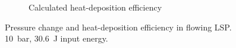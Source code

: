 \begin{figure}[h]
\begin{subfigure}[t]{0.47\textwidth}
                \caption{Calculated heat-deposition efficiency}
                \label{fig:flow_pressure_efficiency}
            \end{subfigure}
            \caption[Pressure change and heat-deposition efficiency in flowing LSP]{Pressure change and heat-deposition efficiency in flowing LSP. \qty{10}{bar}, \qty{30.6}{J} input energy.}
            \label{fig:flow_pressure}
        \end{figure}